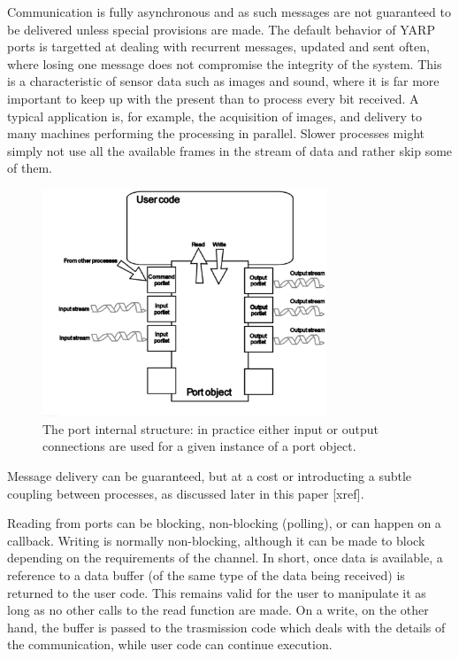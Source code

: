 Communication is fully asynchronous and as such messages are not guaranteed to be 
delivered unless special provisions are made. The default behavior of YARP ports 
is targetted at dealing with recurrent messages, updated and sent often, where losing 
one message does not compromise the integrity of the system. This is a characteristic
of sensor data such as images and sound, where it is far more important to keep
up with the present than to process every bit received.  
%
%
A
typical application is, for example, the acquisition of images, and delivery to many 
machines performing the processing in parallel. Slower processes might simply not
use all the available frames in the stream of data and rather skip some of them.

\begin{figure}
	\centering
		\includegraphics[width=8.5cm]{port.eps}
	\caption{The port internal structure: in practice either input or output connections
	are used for a given instance of a port object.}
	\label{fig:port}
\end{figure}


Message delivery can be guaranteed, but at a cost or introducting a subtle coupling
between processes, as discussed later in this paper [xref].

Reading from ports can be blocking, non-blocking (polling), or can happen on a callback.
Writing is normally non-blocking, although it can be made to block depending on the requirements of the channel. In short, once data is available, a reference to a data
buffer (of the same type of the data being received) is returned to the user code. This
remains valid for the user to manipulate it as long as no other calls to the read function
are made. 
On a write, on the other hand, the buffer is passed to the trasmission code which deals
with the details of the communication, while user code can continue execution.

